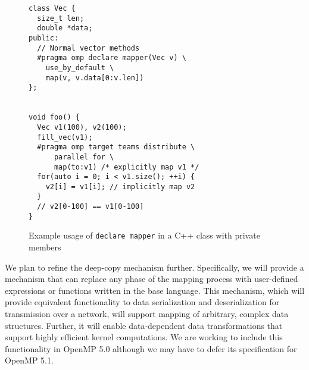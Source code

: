 \begin{figure}
\begin{verbatim}
class Vec {
  size_t len;
  double *data;
public:
  // Normal vector methods
  #pragma omp declare mapper(Vec v) \
    use_by_default \
    map(v, v.data[0:v.len])
};


void foo() {
  Vec v1(100), v2(100);
  fill_vec(v1);
  #pragma omp target teams distribute \
      parallel for \
      map(to:v1) /* explicitly map v1 */
  for(auto i = 0; i < v1.size(); ++i) { 
    v2[i] = v1[i]; // implicitly map v2
  }
  // v2[0-100] == v1[0-100]
}
\end{verbatim}
\caption{Example usage of \texttt{declare mapper} in a C++ class with private
members}
\label{fig:mapper}
\end{figure}

We plan to refine the deep-copy mechanism further. Specifically, we will 
provide a mechanism that can replace any phase of the mapping process with 
user-defined expressions or functions written in the base language. This 
mechanism, which will provide equivalent functionality to data  serialization 
and deserialization for transmission over a network,  will support mapping 
of arbitrary, complex data structures. Further, it will enable data-dependent 
data transformations that support highly efficient kernel computations. We
are working to include this functionality in OpenMP 5.0 although we may
have to defer its specification for OpenMP 5.1.




